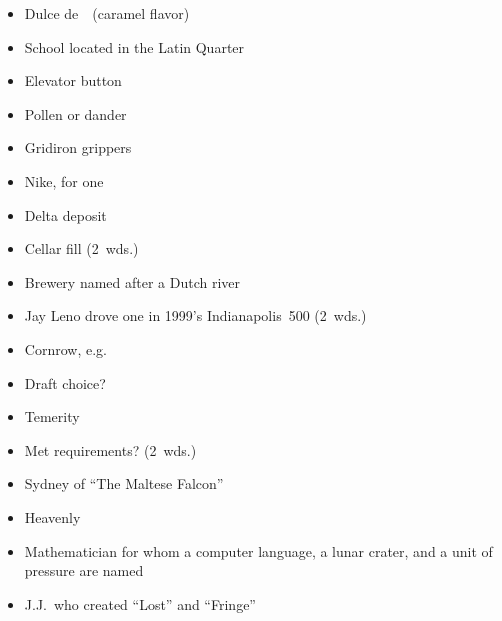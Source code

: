 {\begin{itemize}
      \item
        Dulce de~\blank\ (caramel flavor)
      \item
        School located in the Latin Quarter
    \end{itemize}
  \item
    \begin{itemize}
      \item
        Elevator button
      \item
        Pollen or dander
    \end{itemize}
  \item
    \begin{itemize}
      \item
        Gridiron grippers
      \item
        Nike, for one
    \end{itemize}
  \item
    \begin{itemize}
      \item
        Delta deposit
      \item
        Cellar fill (2~wds.)
    \end{itemize}
  \item
    \begin{itemize}
      \item
        Brewery named after a Dutch river
      \item
        Jay Leno drove one in 1999's Indianapolis~500 (2~wds.)
    \end{itemize}
  \item
    \begin{itemize}
      \item
        Cornrow, e.g.
      \item
        Draft choice?
    \end{itemize}
}{%
  \item
    \begin{itemize}
      \item
        Temerity
      \item
        Met requirements? (2~wds.)
      \item
        Sydney of ``The Maltese Falcon''
      \item
        Heavenly
      \item
        Mathematician for whom a computer language, a lunar crater, and a unit of pressure are named
      \item
        J.J.\ who created ``Lost'' and ``Fringe''
    \end{itemize}
}
